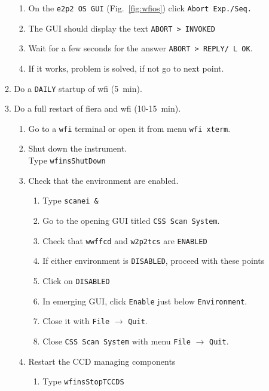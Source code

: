 \documentclass[11pt,fleqn]{book} %
\begin{document}
\begin{enumerate}
\begin{enumerate}
\begin{enumerate}
           \item On the \texttt{e2p2 OS GUI} (Fig.~\ref{fig:wfios}) click \texttt{Abort Exp./Seq.}
           \item The GUI should display the text \texttt{ABORT    > INVOKED}
           \item Wait for a few seconds for the answer \texttt{ABORT    > REPLY/ L   OK}.
           \item If it works, problem is solved, if not go to next point.
        \end{enumerate}
      \item Do a \texttt{DAILY} startup of \gls{wfi} (5~min).
      \item\label{list:wfifierarestart} Do a full restart of \gls{fiera} and \gls{wfi} (10-15~min).
        \begin{enumerate}
          \item Go to a \texttt{wfi} terminal or open it from menu \texttt{wfi xterm}.
          \item Shut down the instrument.\\
                Type \texttt{wfinsShutDown}
          \item Check that the environment are enabled.
             \begin{enumerate}
               \item Type \texttt{scanei \&} 
               \item Go to the opening GUI titled \texttt{CSS Scan System}.
               \item Check that \texttt{wwffcd} and \texttt{w2p2tcs} are \texttt{ENABLED}
               \item If either environment is \texttt{DISABLED}, proceed with these points
               \item Click on \texttt{DISABLED}
               \item In emerging GUI, click \texttt{Enable} just below \texttt{Environment}.
               \item Close it with \texttt{File} $\rightarrow$ \texttt{Quit}.
               \item Close \texttt{CSS Scan System} with menu \texttt{File} $\rightarrow$ \texttt{Quit}.
            \end{enumerate} 
          \item Restart the CCD managing components
             \begin{enumerate} 
               \item Type \texttt{wfinsStopTCCDS}

\end{enumerate}
\end{enumerate}
\end{enumerate}
\end{enumerate}
\end{document}
